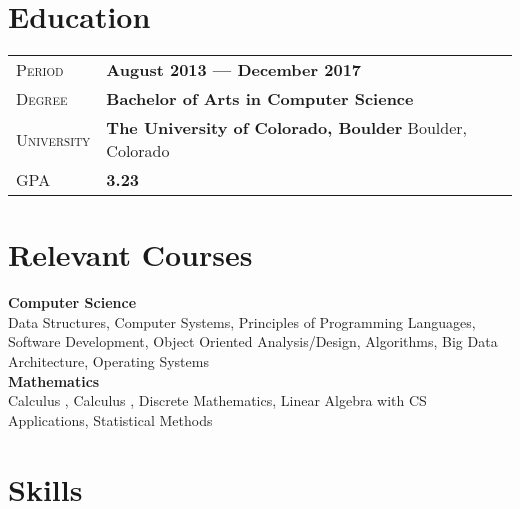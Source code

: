 \documentclass[a4paper, oneside, final]{scrartcl} %
\newcommand{\RN}[1]{%
  \textup{\uppercase\expandafter{\romannumeral#1}}%
}
\newcommand{\gray}{\rowcolor[gray]{.90}} %
\begin{document}
\begin{center}
    \vspace{5pt}



      \section{Education}

      \begin{tabularx}{0.97\linewidth}{>{\raggedleft\scshape}p{2cm}X}
      \gray Period & \textbf{August 2013 --- December 2017}\\
      \gray Degree & \textbf{Bachelor of Arts in Computer Science}\\
      \gray University & \textbf{The University of Colorado, Boulder} \hfill  Boulder, Colorado\\
      \gray GPA & \textbf{3.23}
\end{tabularx}

\section{Relevant Courses}
\begin{flushleft}
\textbf{Computer Science}
\\Data Structures, Computer Systems, Principles of Programming Languages,
Software Development, Object Oriented Analysis/Design, Algorithms, Big Data Architecture, Operating Systems
\vspace{5pt}
\\\textbf{Mathematics}
\\Calculus \RN{1}, Calculus \RN{2}, Discrete Mathematics, Linear Algebra with CS Applications, Statistical Methods
\end{flushleft}
\vspace{5pt}



\section{Skills}


\end{center}
\end{document}
